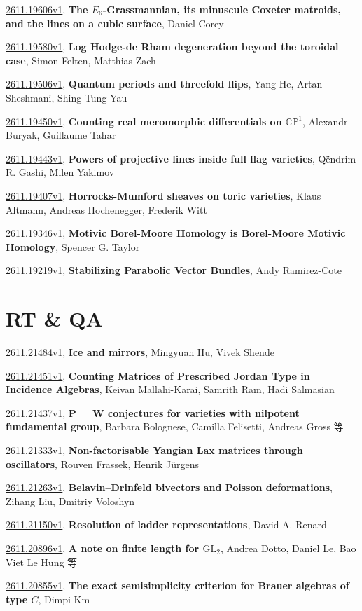 \documentclass[9pt, a4paper]{article}
\theoremstyle{plain}
\theoremstyle{definition}
\theoremstyle{remark}
\newcommand{\arxiv}[3]{\href{https://arxiv.org/abs/#1}{#1}, \textbf{\textcolor{arxivblue}{#2}}, #3}
\begin{document}
\arxiv{2611.19606v1}{The $E_6$-Grassmannian, its minuscule Coxeter matroids, and the lines on a cubic surface}{Daniel Corey}

\arxiv{2611.19580v1}{Log Hodge-de Rham degeneration beyond the toroidal case}{Simon Felten, Matthias Zach}

\arxiv{2611.19506v1}{Quantum periods and threefold flips}{Yang He, Artan Sheshmani, Shing-Tung Yau}

\arxiv{2611.19450v1}{Counting real meromorphic differentials on $\mathbb{CP}^1$}{Alexandr Buryak, Guillaume Tahar}

\arxiv{2611.19443v1}{Powers of projective lines inside full flag varieties}{Qëndrim R. Gashi, Milen Yakimov}

\arxiv{2611.19407v1}{Horrocks-Mumford sheaves on toric varieties}{Klaus Altmann, Andreas Hochenegger, Frederik Witt}

\arxiv{2611.19346v1}{Motivic Borel-Moore Homology is Borel-Moore Motivic Homology}{Spencer G. Taylor}

\arxiv{2611.19219v1}{Stabilizing Parabolic Vector Bundles}{Andy Ramirez-Cote}


\section{RT \& QA}
\arxiv{2611.21484v1}{Ice and mirrors}{Mingyuan Hu, Vivek Shende}

\arxiv{2611.21451v1}{Counting Matrices of Prescribed Jordan Type in Incidence Algebras}{Keivan Mallahi-Karai, Samrith Ram, Hadi Salmasian}

\arxiv{2611.21437v1}{P = W conjectures for varieties with nilpotent fundamental group}{Barbara Bolognese, Camilla Felisetti, Andreas Gross 等}

\arxiv{2611.21333v1}{Non-factorisable Yangian Lax matrices through oscillators}{Rouven Frassek, Henrik Jürgens}

\arxiv{2611.21263v1}{Belavin--Drinfeld bivectors and Poisson deformations}{Zihang Liu, Dmitriy Voloshyn}

\arxiv{2611.21150v1}{Resolution of ladder representations}{David A. Renard}

\arxiv{2611.20896v1}{A note on finite length for $\mathrm{GL}_2$}{Andrea Dotto, Daniel Le, Bao Viet Le Hung 等}

\arxiv{2611.20855v1}{The exact semisimplicity criterion for Brauer algebras of type $C$}{Dimpi Km}
\end{document}
